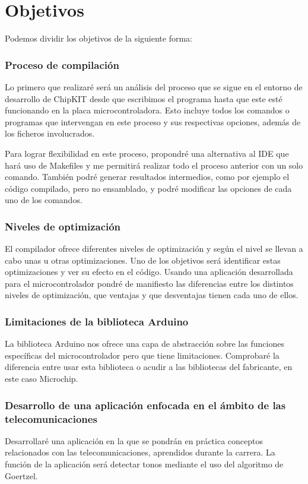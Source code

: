 \section{Objetivos}
Podemos dividir los objetivos de la siguiente forma:

\subsubsection{Proceso de compilación}
Lo primero que realizaré será un análisis del proceso que se sigue en el entorno de desarrollo de ChipKIT desde que escribimos el programa hasta que este esté funcionando en la placa microcontroladora.  Esto incluye todos los comandos o programas que intervengan en este proceso y sus respectivas opciones, además de los ficheros involucrados.

Para lograr flexibilidad en este proceso, propondré una alternativa al IDE que hará uso de Makefiles y me permitirá realizar todo el proceso anterior con un solo comando. También podré generar resultados intermedios, como por ejemplo el código compilado, pero no ensamblado, y podré modificar las opciones de cada uno de los comandos.

\subsubsection{Niveles de optimización}
El compilador ofrece diferentes niveles de optimización y según el nivel se llevan a cabo unas u otras optimizaciones. Uno de los objetivos será identificar estas optimizaciones y ver su efecto en el código. Usando una aplicación desarrollada para el microcontrolador pondré de manifiesto las diferencias entre los distintos niveles de optimización, que ventajas y que desventajas tienen cada uno de ellos.

\subsubsection{Limitaciones de la biblioteca Arduino}
La biblioteca Arduino nos ofrece una capa de abstracción sobre las funciones específicas del microcontrolador pero que tiene limitaciones. Comprobaré la diferencia entre usar esta biblioteca o acudir a las bibliotecas del fabricante, en este caso Microchip.

\subsubsection{Desarrollo de una aplicación enfocada en el ámbito de las telecomunicaciones}
Desarrollaré una aplicación en la que se pondrán en práctica conceptos relacionados con las telecomunicaciones, aprendidos durante la carrera. La función de la aplicación será detectar tonos mediante el uso del algoritmo de Goertzel.


